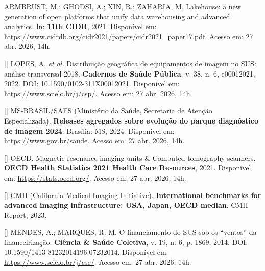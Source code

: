 \documentclass[12pt,a4paper,oneside]{article}
\begin{document}
\begin{singlespace}
\noindent\hangindent=1.25cm
ARMBRUST, M.; GHODSI, A.; XIN, R.; ZAHARIA, M. Lakehouse: a new
generation of open platforms that unify data warehousing and
advanced analytics. In: \textbf{11th CIDR}, 2021. Disponível em:
\url{https://www.cidrdb.org/cidr2021/papers/cidr2021_paper17.pdf}.
Acesso em: 27 abr. 2026, 14h.\par\smallskip

\noindent\hangindent=1.25cm
[\thebibctr] LOPES, A. \textit{et al.} Distribuição geográfica de equipamentos
de imagem no SUS: análise transversal 2018. \textbf{Cadernos de
Saúde Pública}, v. 38, n. 6, e00012021, 2022. DOI:
10.1590/0102-311X00012021. Disponível em:
\url{https://www.scielo.br/j/csp/}. Acesso em: 27 abr. 2026,
14h.\label{ref:lopes}\par\smallskip

\noindent\hangindent=1.25cm
[\thebibctr] MS-BRASIL/SAES (Ministério da Saúde, Secretaria de Atenção
Especializada). \textbf{Releases agregados sobre evolução do
parque diagnóstico de imagem 2024}. Brasília: MS, 2024.
Disponível em: \url{https://www.gov.br/saude}. Acesso em:
27 abr. 2026, 14h.\label{ref:ms-equipamentos}\par\smallskip

\noindent\hangindent=1.25cm
[\thebibctr] OECD. Magnetic resonance imaging units \& Computed tomography
scanners. \textbf{OECD Health Statistics 2021 \textendash{}
Health Care Resources}, 2021. Disponível em:
\url{https://stats.oecd.org/}. Acesso em: 27 abr. 2026,
14h.\label{ref:oecd-mri}\par\smallskip

\noindent\hangindent=1.25cm
[\thebibctr] CMII (California Medical Imaging Initiative). \textbf{International
benchmarks for advanced imaging infrastructure: USA, Japan, OECD
median}. CMII Report, 2023.\label{ref:cmii}\par\smallskip

\noindent\hangindent=1.25cm
[\thebibctr] MENDES, A.; MARQUES, R. M. O financiamento do SUS sob os ``ventos''
da financeirização. \textbf{Ciência \& Saúde Coletiva}, v. 19, n. 6,
p. 1869, 2014. DOI:
10.1590/1413-81232014196.07232014. Disponível em:
\url{https://www.scielo.br/j/csc/}. Acesso em: 27 abr. 2026,
14h.\label{ref:mendes-marques}\par\smallskip


\end{singlespace}
\end{document}
